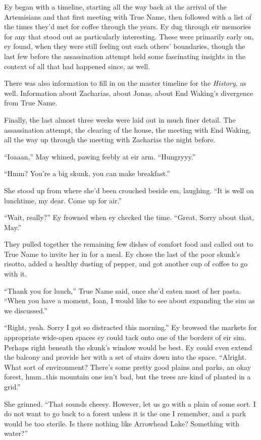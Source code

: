 Ey began with a timeline, starting all the way back at the arrival of the Artemisians and that first meeting with True Name, then followed with a list of the times they'd met for coffee through the years. Ey dug through eir memories for any that stood out as particularly interesting. These were primarily early on, ey found, when they were still feeling out each others' boundaries, though the last few before the assassination attempt held some fascinating insights in the context of all that had happened since, as well.

There was also information to fill in on the master timeline for the \emph{History}, as well. Information about Zacharias, about Jonas, about End Waking's divergence from True Name.

Finally, the last almost three weeks were laid out in much finer detail. The assassination attempt, the clearing of the house, the meeting with End Waking, all the way up through the meeting with Zacharias the night before.

``Ioaaan,'' May whined, pawing feebly at eir arm. ``Hungryyy.''

``Hmm? You're a big skunk, you can make breakfast.''

She stood up from where she'd been crouched beside em, laughing. ``It is well on lunchtime, my dear. Come up for air.''

``Wait, really?'' Ey frowned when ey checked the time. ``Great. Sorry about that, May.''

They pulled together the remaining few dishes of comfort food and called out to True Name to invite her in for a meal. Ey chose the last of the poor skunk's risotto, added a healthy dusting of pepper, and got another cup of coffee to go with it.

``Thank you for lunch,'' True Name said, once she'd eaten most of her pasta. ``When you have a moment, Ioan, I would like to see about expanding the sim as we discussed.''

``Right, yeah. Sorry I got so distracted this morning.'' Ey browsed the markets for appropriate wide-open spaces ey could tack onto one of the borders of eir sim. Perhaps right beneath the skunk's window would be best. Ey could even extend the balcony and provide her with a set of stairs down into the space. ``Alright. What sort of environment? There's some pretty good plains and parks, an okay forest, hmm\ldots this mountain one isn't bad, but the trees are kind of planted in a grid.''

She grinned. ``That sounds cheesy. However, let us go with a plain of some sort. I do not want to go back to a forest unless it is the one I remember, and a park would be too sterile. Is there nothing like Arrowhead Lake? Something with water?''

